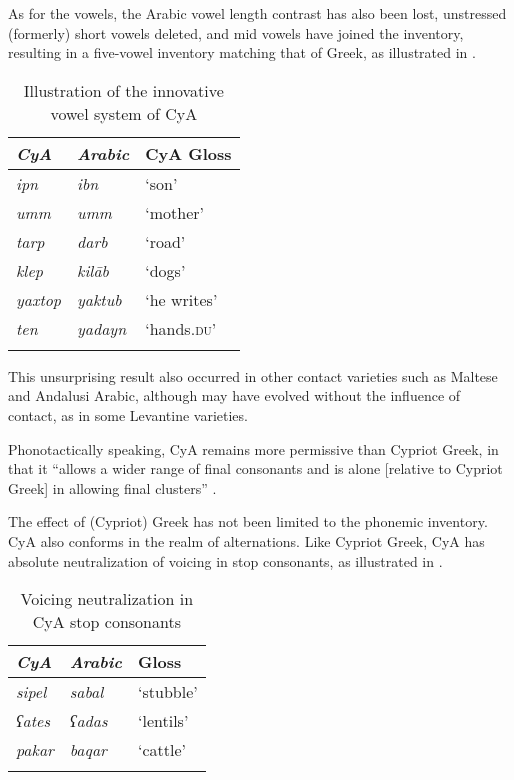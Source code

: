 \documentclass[output=paper]{langsci/langscibook}
\begin{document}
As for the vowels, the Arabic vowel length contrast has also been lost, unstressed (formerly) short vowels deleted, and mid vowels have joined the inventory, resulting in a five-vowel inventory matching that of Greek, as illustrated in .

\begin{table}
\begin{tabular}{>{\itshape}l>{\itshape}ll}
\lsptoprule
{\normalfont CyA} & {\normalfont Arabic} & {CyA Gloss}\\\midrule
ipn & ibn & ‘son’\\
umm & umm & ‘mother’\\
tarp & darb & ‘road’\\
klep & kilāb & ‘dogs’\\
yaxtop & yaktub & ‘he writes’\\
ten & yadayn & ‘hands\textsc{.du}’\\
\lspbottomrule
\end{tabular}
\caption{\label{bkm:Ref13775635}Illustration of the innovative vowel system of CyA\label{tab:walter:2}}
\end{table}

This unsurprising result also occurred in other contact varieties such as Maltese and Andalusi Arabic, although may have evolved without the influence of contact, as in some Levantine varieties. 

Phonotactically speaking, CyA remains more permissive than Cypriot Greek, in that it “allows a wider range of final consonants and is alone [relative to Cypriot Greek] in allowing final clusters” \citep[51]{Newton1964}.

The effect of (Cypriot) Greek has not been limited to the phonemic inventory. CyA also conforms in the realm of alternations. Like Cypriot Greek, CyA has absolute neutralization of voicing in stop consonants, as illustrated in .

\begin{table}
\begin{tabular}{>{\itshape}l>{\itshape}ll}
\lsptoprule
{\normalfont CyA} & {\normalfont Arabic} & {Gloss}\\\midrule
sipel & sabal & ‘stubble’\\
{}ʕates & ʕadas & ‘lentils’\\
pakar & baqar & ‘cattle’\\
\lspbottomrule
\end{tabular}
\caption{\label{bkm:Ref13775945}Voicing neutralization in CyA stop consonants\label{tab:walter:3}}
\end{table}
\end{document}

